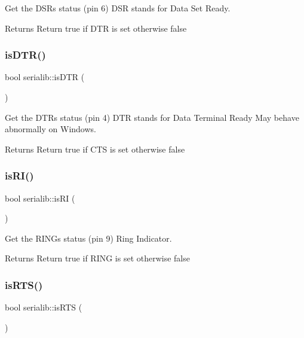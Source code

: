 Get the D\+SR\textquotesingle{}s status (pin 6) D\+SR stands for Data Set Ready. 

\begin{DoxyReturn}{Returns}
Return true if D\+TR is set otherwise false 
\end{DoxyReturn}
\mbox{\label{classserialib_a4ec78286be81602bf1df44a4eb8372a8}} 
\subsubsection{\texorpdfstring{is\+D\+T\+R()}{isDTR()}}
{\footnotesize\ttfamily bool serialib\+::is\+D\+TR (\begin{DoxyParamCaption}{ }\end{DoxyParamCaption})}



Get the D\+TR\textquotesingle{}s status (pin 4) D\+TR stands for Data Terminal Ready May behave abnormally on Windows. 

\begin{DoxyReturn}{Returns}
Return true if C\+TS is set otherwise false 
\end{DoxyReturn}
\mbox{\label{classserialib_a605d8a8015fadb5db5521350aefe084e}} 
\subsubsection{\texorpdfstring{is\+R\+I()}{isRI()}}
{\footnotesize\ttfamily bool serialib\+::is\+RI (\begin{DoxyParamCaption}{ }\end{DoxyParamCaption})}



Get the R\+I\+NG\textquotesingle{}s status (pin 9) Ring Indicator. 

\begin{DoxyReturn}{Returns}
Return true if R\+I\+NG is set otherwise false 
\end{DoxyReturn}
\mbox{\label{classserialib_ab2b121af07fb732f82668f6a14e93cfb}} 
\subsubsection{\texorpdfstring{is\+R\+T\+S()}{isRTS()}}
{\footnotesize\ttfamily bool serialib\+::is\+R\+TS (\begin{DoxyParamCaption}{ }\end{DoxyParamCaption})}



